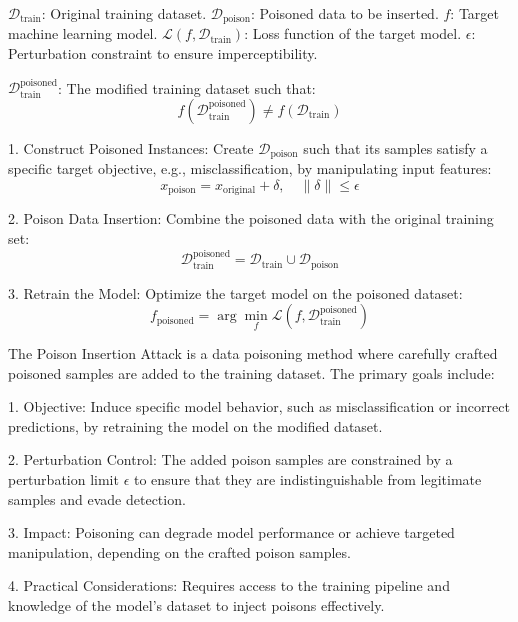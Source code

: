 $\mathcal{D}_{\text{train}}$: Original training dataset.  
$\mathcal{D}_{\text{poison}}$: Poisoned data to be inserted.  
$f$: Target machine learning model.  
$\mathcal{L}(f, \mathcal{D}_{\text{train}})$: Loss function of the target model.  
$\epsilon$: Perturbation constraint to ensure imperceptibility.  

$\mathcal{D}_{\text{train}}^{\text{poisoned}}$: The modified training dataset such that:  
\[
f(\mathcal{D}_{\text{train}}^{\text{poisoned}}) \neq f(\mathcal{D}_{\text{train}})
\]

1. Construct Poisoned Instances:  
   Create $\mathcal{D}_{\text{poison}}$ such that its samples satisfy a specific target objective, e.g., misclassification, by manipulating input features:  
   \[
   x_{\text{poison}} = x_{\text{original}} + \delta, \quad \|\delta\| \leq \epsilon
   \]  

2. Poison Data Insertion:  
   Combine the poisoned data with the original training set:  
   \[
   \mathcal{D}_{\text{train}}^{\text{poisoned}} = \mathcal{D}_{\text{train}} \cup \mathcal{D}_{\text{poison}}
   \]

3. Retrain the Model:  
   Optimize the target model on the poisoned dataset:  
   \[
   f_{\text{poisoned}} = \arg \min_f \mathcal{L}(f, \mathcal{D}_{\text{train}}^{\text{poisoned}})
   \]  

The Poison Insertion Attack is a data poisoning method where carefully crafted poisoned samples are added to the training dataset. The primary goals include:  

1. Objective: Induce specific model behavior, such as misclassification or incorrect predictions, by retraining the model on the modified dataset.  

2. Perturbation Control: The added poison samples are constrained by a perturbation limit $\epsilon$ to ensure that they are indistinguishable from legitimate samples and evade detection.  

3. Impact: Poisoning can degrade model performance or achieve targeted manipulation, depending on the crafted poison samples.  

4. Practical Considerations: Requires access to the training pipeline and knowledge of the model’s dataset to inject poisons effectively.
